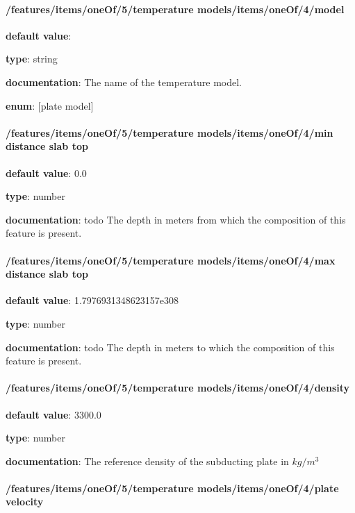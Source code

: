 \paragraph{/features/items/oneOf/5/temperature models/items/oneOf/4/model} \begin{itemized}
\item {\bf default value}: 
\item {\bf type}: string
\item {\bf documentation}: The name of the temperature model.
\item {\bf enum}: [plate model]\end{itemized}\paragraph{/features/items/oneOf/5/temperature models/items/oneOf/4/min distance slab top} \begin{itemized}
\item {\bf default value}: 0.0
\item {\bf type}: number
\item {\bf documentation}: todo The depth in meters from which the composition of this feature is present.
\end{itemized}\paragraph{/features/items/oneOf/5/temperature models/items/oneOf/4/max distance slab top} \begin{itemized}
\item {\bf default value}: 1.7976931348623157e308
\item {\bf type}: number
\item {\bf documentation}: todo The depth in meters to which the composition of this feature is present.
\end{itemized}\paragraph{/features/items/oneOf/5/temperature models/items/oneOf/4/density} \begin{itemized}
\item {\bf default value}: 3300.0
\item {\bf type}: number
\item {\bf documentation}: The reference density of the subducting plate in $kg/m^3$
\end{itemized}\paragraph{/features/items/oneOf/5/temperature models/items/oneOf/4/plate velocity} \begin{itemized}

\end{itemized}
